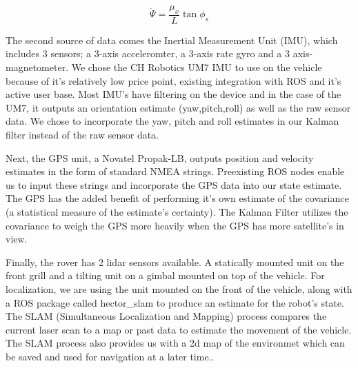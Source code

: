 \begin{equation}
\dot{\Psi} = \frac{\mu_x}{L}\tan{\phi_s}
\end{equation}

The second source of data comes the Inertial Measurement Unit (IMU), which includes 3 sensors; a 3-axis acceleromter, a 3-axis rate gyro and a 3 axis-magnetometer. We chose the CH Robotics UM7 IMU to use on the vehicle because of it's relatively low price point, existing integration with ROS and it's active user base. Most IMU's have filtering on the device and in the case of the UM7, it outputs an orientation estimate (yaw,pitch,roll) as well as the raw sensor data. We chose to incorporate the yaw, pitch and roll estimates in our Kalman filter instead of the raw sensor data. 

Next, the GPS unit, a Novatel Propak-LB, outputs position and velocity estimates in the form of standard NMEA strings. Preexisting ROS nodes enable us to input these strings and incorporate the GPS data into our state estimate. The GPS has the added benefit of performing it's own estimate of the covariance (a statistical measure of the estimate's certainty). The Kalman Filter utilizes the covariance to weigh the GPS more heavily when the GPS has more satellite's in view.

Finally, the rover has 2 lidar sensors available. A statically mounted unit on the front grill and a tilting unit on a gimbal mounted on top of the vehicle. For localization, we are using the unit mounted on the front of the vehicle, along with a ROS package called hector\_slam to produce an estimate for the robot's state. The SLAM (Simultaneous Localization and Mapping) process compares the current laser scan to a map or past data to estimate the movement of the vehicle. The SLAM process also provides us with a 2d map of the environmet which can be saved and used for navigation at a later time..